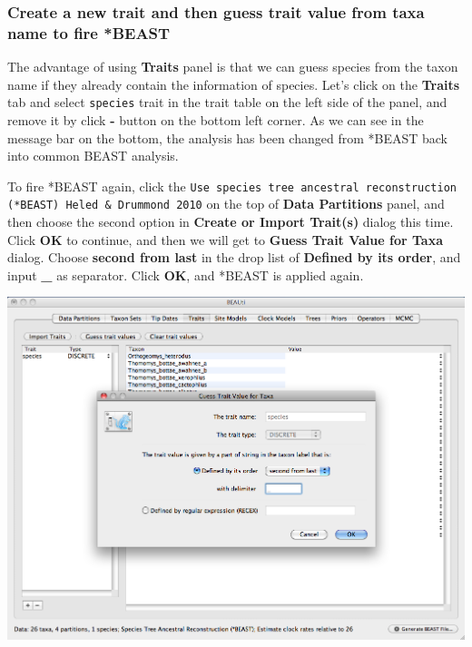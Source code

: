 \documentclass[12pt]{article}
\begin{document}
\medskip{}


\subsubsection*{Create a new trait and then guess trait value from taxa name to fire *BEAST}

The advantage of using {\bf Traits} panel is that we can guess species from the taxon name if they already contain the information of species. Let's click on the {\bf Traits} tab and select \texttt{species} trait in the trait table on the left side of the panel, and remove it by click \textbf{-} button on the bottom left corner. As we can see in the message bar on the bottom, the analysis has been changed from *BEAST back into common BEAST analysis.

To fire *BEAST again, click the \texttt{Use species tree ancestral reconstruction (*BEAST) Heled \& Drummond 2010} on the top of {\bf Data Partitions} panel, and then choose the second option in {\bf Create or Import Trait(s)} dialog this time. Click \textbf{OK} to continue, and then we will get to {\bf Guess Trait Value for Taxa} dialog. Choose \textbf{second from last} in the drop list of \textbf{Defined by its order}, and input \textbf{\_} as separator. Click \textbf{OK}, and *BEAST is applied again.

\medskip{}

\includegraphics[scale=0.4]{figures/BEAUti_GuessTrait}

\medskip{}

\medskip{}
\end{document}
